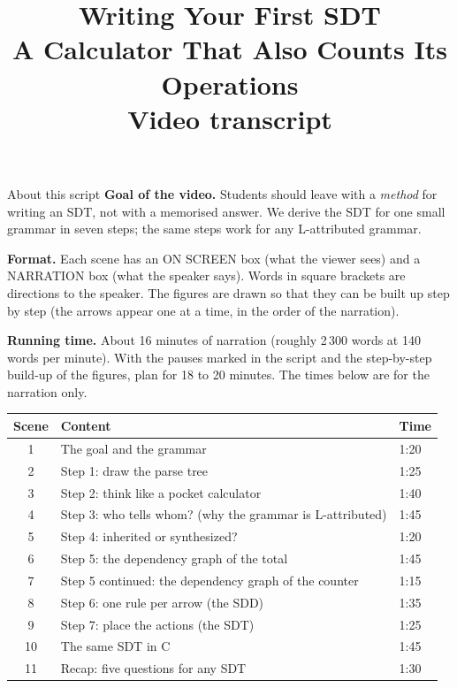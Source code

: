 \documentclass[11pt,a4paper]{article}
\title{\textbf{Writing Your First SDT}\\[4pt]\large A Calculator That Also Counts Its Operations\\[6pt]\normalsize Video transcript}
\author{}
\date{}
\newcounter{scene}
\begin{document}
\maketitle
\thispagestyle{fancy}

\begin{notebox}{About this script}
\textbf{Goal of the video.} Students should leave with a \emph{method} for writing an SDT, not with a memorised answer. We derive the SDT for one small grammar in seven steps; the same steps work for any L-attributed grammar.

\textbf{Format.} Each scene has an \textsf{ON SCREEN} box (what the viewer sees) and a \textsf{NARRATION} box (what the speaker says). Words in square brackets are directions to the speaker. The figures are drawn so that they can be built up step by step (the arrows appear one at a time, in the order of the narration).

\textbf{Running time.} About 16 minutes of narration (roughly 2\,300 words at 140 words per minute). With the pauses marked in the script and the step-by-step build-up of the figures, plan for 18 to 20 minutes. The times below are for the narration only.

\begin{center}
\small
\begin{tabular}{@{}c l l@{}}
\toprule
\textbf{Scene} & \textbf{Content} & \textbf{Time} \\ \midrule
1 & The goal and the grammar & 1:20 \\
2 & Step 1: draw the parse tree & 1:25 \\
3 & Step 2: think like a pocket calculator & 1:40 \\
4 & Step 3: who tells whom? (why the grammar is L-attributed) & 1:45 \\
5 & Step 4: inherited or synthesized? & 1:20 \\
6 & Step 5: the dependency graph of the total & 1:45 \\
7 & Step 5 continued: the dependency graph of the counter & 1:15 \\
8 & Step 6: one rule per arrow (the SDD) & 1:35 \\
9 & Step 7: place the actions (the SDT) & 1:25 \\
10 & The same SDT in C & 1:45 \\
11 & Recap: five questions for any SDT & 1:30 \\ \bottomrule
\end{tabular}
\end{center}
\end{notebox}
\end{document}

